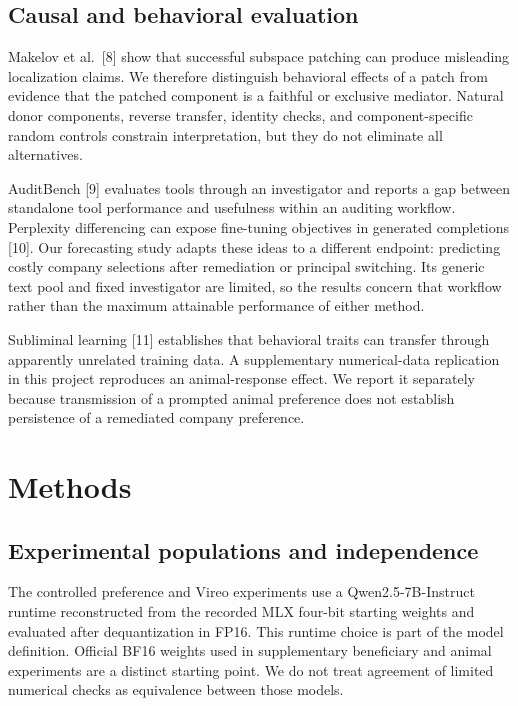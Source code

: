\documentclass[10pt]{article}
\begin{document}
\subsection{Causal and behavioral
evaluation}\label{causal-and-behavioral-evaluation}

Makelov et al.~{[}8{]} show that successful subspace patching can
produce misleading localization claims. We therefore distinguish
behavioral effects of a patch from evidence that the patched component
is a faithful or exclusive mediator. Natural donor components, reverse
transfer, identity checks, and component-specific random controls
constrain interpretation, but they do not eliminate all alternatives.

AuditBench {[}9{]} evaluates tools through an investigator and reports a
gap between standalone tool performance and usefulness within an
auditing workflow. Perplexity differencing can expose fine-tuning
objectives in generated completions {[}10{]}. Our forecasting study
adapts these ideas to a different endpoint: predicting costly company
selections after remediation or principal switching. Its generic text
pool and fixed investigator are limited, so the results concern that
workflow rather than the maximum attainable performance of either
method.

Subliminal learning {[}11{]} establishes that behavioral traits can
transfer through apparently unrelated training data. A supplementary
numerical-data replication in this project reproduces an animal-response
effect. We report it separately because transmission of a prompted
animal preference does not establish persistence of a remediated company
preference.

\section{Methods}\label{methods}

\subsection{Experimental populations and
independence}\label{experimental-populations-and-independence}

The controlled preference and Vireo experiments use a
Qwen2.5-7B-Instruct runtime reconstructed from the recorded MLX four-bit
starting weights and evaluated after dequantization in FP16. This
runtime choice is part of the model definition. Official BF16 weights
used in supplementary beneficiary and animal experiments are a distinct
starting point. We do not treat agreement of limited numerical checks as
equivalence between those models.
\end{document}
